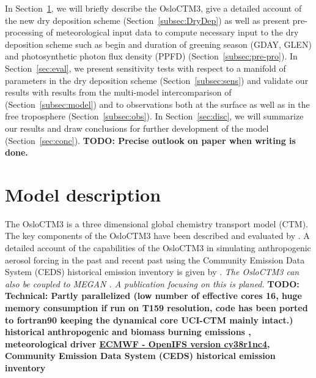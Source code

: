 \documentclass[gmd, manuscript]{copernicus}
\begin{document}
In Section~\ref{sec:model_des}, we will briefly describe the OsloCTM3, give a detailed account of the new dry deposition scheme (Section~\ref{subsec:DryDep}) as well as present pre-processing of meteorological input data to compute necessary input to the dry deposition scheme such as begin and duration of greening season (GDAY, GLEN) and photosynthetic photon flux density (PPFD) (Section~\ref{subsec:pre-pro}). In Section~\ref{sec:eval}, we present sensitivity tests with respect to a manifold of parameters in the dry deposition scheme (Section~\ref{subsec:sens}) and validate our results with results from the multi-model intercomparison of \citet{ACP:Hardacre2015} (Section~\ref{subsec:model}) and to observations both at the surface as well as in the free troposphere (Section~\ref{subsec:obs}). In Section~\ref{sec:disc}, we will summarize our results and draw conclusions for further development of the model (Section~\ref{sec:conc}).
{\bf TODO: Precise outlook on paper when writing is done.}
\section{Model description}
\label{sec:model_des}
The OsloCTM3 is a three dimensional global chemistry transport model (CTM). The key components of the OsloCTM3 have been described and evaluated by \citet{GMD:Sovde2012}. A detailed account of the capabilities of the OsloCTM3 in simulating anthropogenic aerosol forcing in the past and recent past using the Community Emission Data System (CEDS) historical emission inventory \citep{GMD:Hoesly2018} is given by \citet{GMD:Lund2018}. \emph{The OsloCTM3 can also be coupled to MEGAN \citep{ACP:Guenther2006}. A publication focusing on this is planed.}
{\bf TODO: Technical: Partly parallelized (low number of effective cores 16, huge memory consumption if run on T159 resolution, code has been ported to fortran90 keeping the dynamical core UCI-CTM mainly intact.)
historical anthropogenic and biomass burning emissions \citep{ACP:Lamarque2010}, meteorological driver \href{https://www.ecmwf.int/en/forecasts/documentation-and-support/evolution-ifs/cycle-38r1-summary-changes}{ECMWF - OpenIFS version cy38r1nc4}, Community Emission Data System (CEDS) historical emission inventory \citep{GMD:Hoesly2018}}
\end{document}
